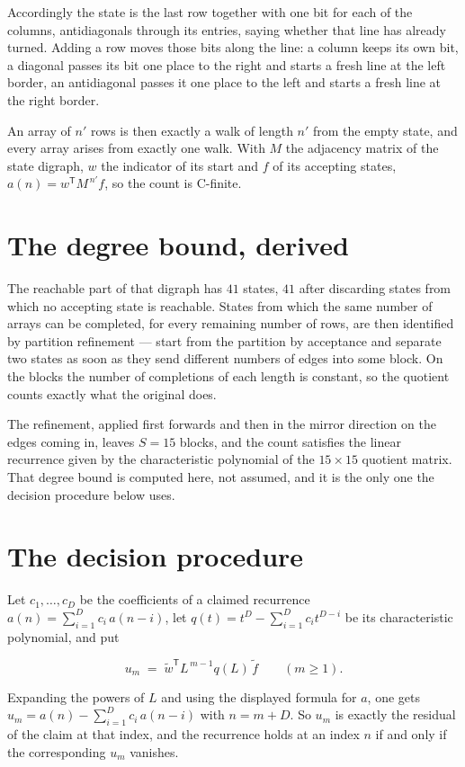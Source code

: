 \documentclass[11pt]{article}
\theoremstyle{definition}
\begin{document}
Accordingly the state is the last row together with one bit for each of the columns, antidiagonals through its entries, saying whether that line has already turned. Adding a row moves those bits along the line: a column keeps its own bit, a diagonal passes its bit one place to the right and starts a fresh line at the left border, an antidiagonal passes it one place to the left and starts a fresh line at the right border.

An array of $n'$ rows is then exactly a walk of length $n'$ from the empty state, and every array arises from exactly one walk. With $M$ the adjacency matrix of the state digraph, $w$ the indicator of its start and $f$ of its accepting states, $a(n) = w^{\mathsf T}M^{\,n'}f$, so the count is C-finite.

\section{The degree bound, derived}

The reachable part of that digraph has $41$ states, $41$ after discarding states from which no accepting state is reachable. States from which the same number of arrays can be completed, for every remaining number of rows, are then identified by partition refinement --- start from the partition by acceptance and separate two states as soon as they send different numbers of edges into some block. On the blocks the number of completions of each length is constant, so the quotient counts exactly what the original does.

The refinement, applied first forwards and then in the mirror direction on the edges coming in, leaves $S = 15$ blocks, and the count satisfies the linear recurrence given by the characteristic polynomial of the $15 \times 15$ quotient matrix. That degree bound is computed here, not assumed, and it is the only one the decision procedure below uses.

\section{The decision procedure}

Let $c_1,\dots,c_D$ be the coefficients of a claimed recurrence $a(n) = \sum_{i=1}^{D} c_i\,a(n-i)$, let $q(t) = t^{D} - \sum_{i=1}^{D} c_i t^{D-i}$ be its characteristic polynomial, and put

\[u_m \;=\; \tilde w^{\mathsf T} L^{\,m-1} q(L)\,\tilde f \qquad (m \ge 1).\]

Expanding the powers of $L$ and using the displayed formula for $a$, one gets $u_m = a(n) - \sum_{i=1}^{D} c_i\,a(n-i)$ with $n = m + D$. So $u_m$ is exactly the residual of the claim at that index, and the recurrence holds at an index $n$ if and only if the corresponding $u_m$ vanishes.
\end{document}
